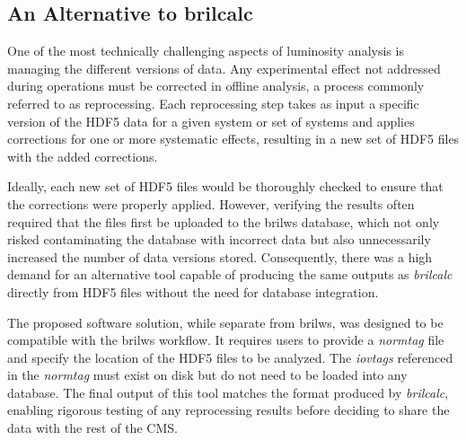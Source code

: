 


\subsection{An Alternative to brilcalc}

One of the most technically challenging aspects of luminosity analysis is managing the different versions of data. Any experimental effect not addressed during operations must be corrected in offline analysis, a process commonly referred to as reprocessing. Each reprocessing step takes as input a specific version of the HDF5 data for a given system or set of systems and applies corrections for one or more systematic effects, resulting in a new set of HDF5 files with the added corrections.

Ideally, each new set of HDF5 files would be thoroughly checked to ensure that the corrections were properly applied. However, verifying the results often required that the files first be uploaded to the brilws database, which not only risked contaminating the database with incorrect data but also unnecessarily increased the number of data versions stored. Consequently, there was a high demand for an alternative tool capable of producing the same outputs as \textit{brilcalc} directly from HDF5 files without the need for database integration.

The proposed software solution, while separate from brilws, was designed to be compatible with the brilws workflow. It requires users to provide a \textit{normtag} file and specify the location of the HDF5 files to be analyzed. The \textit{iovtags} referenced in the \textit{normtag} must exist on disk but do not need to be loaded into any database. The final output of this tool matches the format produced by \textit{brilcalc}, enabling rigorous testing of any reprocessing results before deciding to share the data with the rest of the CMS.

